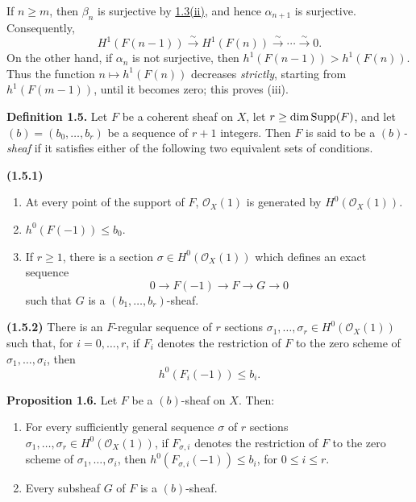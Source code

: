 \newpage
If \(n\geq m\), then \(\beta_n\) is surjective by \hyperlink{sga6.e13.prop.1-3}{1.3(ii)}, and hence
\(\alpha_{n+1}\) is surjective. Consequently,
\[
  H^1(F(n-1))\xrightarrow{\sim}H^1(F(n))
  \xrightarrow{\sim}\cdots\xrightarrow{\sim}0.
\]
On the other hand, if \(\alpha_n\) is not surjective, then
\(h^1(F(n-1))>h^1(F(n))\). Thus the function
\(n\longmapsto h^1(F(n))\) decreases \emph{strictly}, starting from
\(h^1(F(m-1))\), until it becomes zero; this proves (iii).

\textbf{Definition 1.5.} Let \(F\) be a coherent sheaf on \(X\), let
\(r\geq\dim\operatorname{Supp}(F)\), and let \((b)=(b_0,\ldots,b_r)\) be a sequence of
\(r+1\) integers. Then \(F\) is said to be a \emph{\((b)\)-sheaf} if it
satisfies either of the following two equivalent sets of conditions.

\noindent{}\textbf{(1.5.1)}
\begin{enumerate}[label=(\roman*)]
\item At every point of the support of \(F\), \(\mathcal O_X(1)\) is
generated by \(H^0(\mathcal O_X(1))\).
\item \(h^0(F(-1))\leq b_0\).
\item If \(r\geq1\), there is a section
\(\sigma\in H^0(\mathcal O_X(1))\) which defines an exact sequence
\[
  0\longrightarrow F(-1)\longrightarrow F\longrightarrow G\longrightarrow0
\]
such that \(G\) is a \((b_1,\ldots,b_r)\)-sheaf.
\end{enumerate}

\noindent{}\textbf{(1.5.2)} There is an \(F\)-regular sequence of \(r\)
sections \(\sigma_1,\ldots,\sigma_r\in H^0(\mathcal O_X(1))\) such that,
for \(i=0,\ldots,r\), if \(F_i\) denotes the restriction of \(F\) to the
zero scheme of \(\sigma_1,\ldots,\sigma_i\), then
\[
  h^0(F_i(-1))\leq b_i.
\]

\textbf{Proposition 1.6.} Let \(F\) be a \((b)\)-sheaf on \(X\). Then:
\begin{enumerate}[label=(\roman*)]
\item For every sufficiently general sequence \(\sigma\) of \(r\) sections
\(\sigma_1,\ldots,\sigma_r\in H^0(\mathcal O_X(1))\), if
\(F_{\sigma,i}\) denotes the restriction of \(F\) to the zero scheme of
\(\sigma_1,\ldots,\sigma_i\), then
\(h^0(F_{\sigma,i}(-1))\leq b_i\), for \(0\leq i\leq r\).
\item Every subsheaf \(G\) of \(F\) is a \((b)\)-sheaf.
\end{enumerate}

